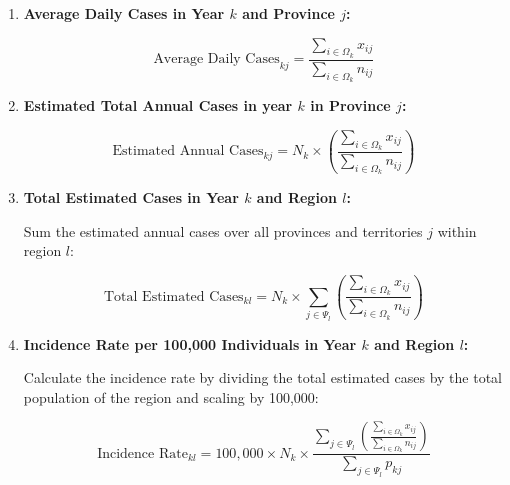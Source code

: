\documentclass[12pt]{article}
\begin{document}
\begin{enumerate}
    \item \textbf{Average Daily Cases in Year \( k \) and Province \( j \):}

    \[
    \text{Average Daily Cases}_{kj} = \frac{\sum_{i \in \Omega_k} x_{ij}}{\sum_{i \in \Omega_k} n_{ij}}
    \]

    \item \textbf{Estimated Total Annual Cases in year \( k \) in Province \( j \):}
  
    \[
    \text{Estimated Annual Cases}_{kj} = N_k \times \left( \frac{\sum_{i \in \Omega_k} x_{ij}}{\sum_{i \in \Omega_k} n_{ij}} \right)
    \]

    \item \textbf{Total Estimated Cases in Year \( k \) and Region \( l \):}

    Sum the estimated annual cases over all provinces and territories \( j \) within region \( l \):

    \[
    \text{Total Estimated Cases}_{kl} = N_k \times \sum_{j \in \Psi_l} \left( \frac{\sum_{i \in \Omega_k} x_{ij}}{\sum_{i \in \Omega_k} n_{ij}} \right)
    \]

    \item \textbf{Incidence Rate per 100,000 Individuals in Year \( k \) and Region \( l \):}

    Calculate the incidence rate by dividing the total estimated cases by the total population of the region and scaling by 100,000:

    \[
    \text{Incidence Rate}_{kl} = 100,000 \times N_k \times \frac{\sum_{j \in \Psi_l} \left( \frac{\sum_{i \in \Omega_k} x_{ij}}{\sum_{i \in \Omega_k} n_{ij}} \right)}{\sum_{j \in \Psi_l} p_{kj}}
    \]
\end{enumerate}
\end{document}
